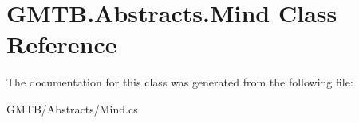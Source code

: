 \hypertarget{class_g_m_t_b_1_1_abstracts_1_1_mind}{}\section{G\+M\+T\+B.\+Abstracts.\+Mind Class Reference}
\label{class_g_m_t_b_1_1_abstracts_1_1_mind}


The documentation for this class was generated from the following file\+:\begin{DoxyCompactItemize}
\item 
G\+M\+T\+B/\+Abstracts/Mind.\+cs\end{DoxyCompactItemize}
